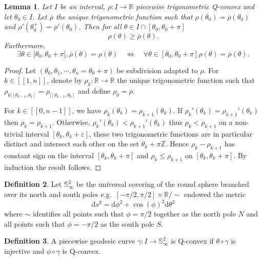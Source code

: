 \documentclass[a4paper,12pt]{article}
\def\ZZ{\mathbb{Z}}
\def\lsem{[\![}
\def\rsem{]\!]}
\def\d{\mathrm{d}}
\def\RR{\mathbb{R}}
\def\SS{\mathbb{S}}
\def\d{\mathrm{d}}
\newcommand{\edt}[1]{{\color{MyDarkRed}{#1}}}
\newtheorem{lem}{Lemma}[section]		 %
\theoremstyle{definition}
\newtheorem{defi}[lem]{Definition}	%
\begin{document}
% 
% 
					\begin{lem}\label{lem:Qconv_trig_ineq}					
					Let $I$ be an interval, $\rho:I \rightarrow \RR$ piecewise trigonometric Q-convex and let $\theta_0 \in I$. Let $\overline \rho$ the unique trigonometric function such that $\rho(\theta_0)=\overline{\rho}(\theta_0)$ and $\rho'(\theta_0^+)=\overline{\rho}'(\theta_0)$.
					Then for all $\theta \in I\cap [\theta_0,\theta_0+\pi]$
					$$\rho(\theta)\geq \overline \rho(\theta).$$
					Furthermore, $$\exists \theta \in ]\theta_0,\theta_0+\pi[,\overline \rho(\theta)=\rho(\theta) \quad \Leftrightarrow \quad  
					\forall \theta \in [\theta_0,\theta_0+\pi] \rho(\theta)=\overline \rho(\theta).$$
					\end{lem}
					\begin{proof}
					 Let $(\theta_0,\theta_1,\cdots,\theta_n=\theta_0+\pi)$ be subdivision adapted to $\rho$.
					 For $k\in \lsem1,n\rsem$, denote by $\rho_k: \RR\rightarrow \RR$ the unique trigonometric function such that
					 $\rho_{k|[\theta_{k-1},\theta_{k}]}=\rho_{|[\theta_{k-1},\theta_{k}]}$ and define $\rho_0=\overline \rho$.

					For $k\in \lsem 0,n-1\rsem$, we have $\rho_k(\theta_k)=\rho_{k+1}(\theta_k)$.
					If $\rho_k'(\theta_k)= \rho_{k+1}'(\theta_k)$ then $\rho_{k}=\rho_{k+1}$.
					Otherwise, $\rho_k'(\theta_k)< \rho_{k+1}'(\theta_k)$ thus $\rho_k<\rho_{k+1}$ on a non-trivial interval
					$[\theta_k,\theta_k+\varepsilon]$, these two trigonometric functions are in particular distinct and intersect each other on the set $\theta_k+\pi\ZZ$. Hence $\rho_k-\rho_{k+1}$ has constant sign on the interval $[\theta_k,\theta_k+\pi]$ and 
					$\rho_k\leq \rho_{k+1}$ on $[\theta_k,\theta_k+\pi]$. By induction the result follows.
					\end{proof}
	


					\begin{defi}\label{def:universal_covering_round_sphere} Let $\SS^2_\infty$ be the universal covering of the round sphere branched over its north and south poles e.g.\ $[-\pi/2,\pi/2]\times \RR /\sim$ endowed the metric $$\d s^2 = \d \phi^2 +\cos(\phi)^2\d \theta^2$$ 
					where $\sim$ identifies all points such that $\phi=\pi/2$ together as the north pole $N$ and all points such that $\phi=-\pi/2$ as the south pole $S$.
					\end{defi}
					\begin{defi}\label{def:piecewise_geodesic_curve_q_convex} A piecewise geodesic curve $\gamma: I\rightarrow \SS^2_\infty$ is Q-convex if $\theta\circ \gamma$ is injective and $\phi\circ \gamma$ is Q-convex.

					\end{defi}
\end{document}
